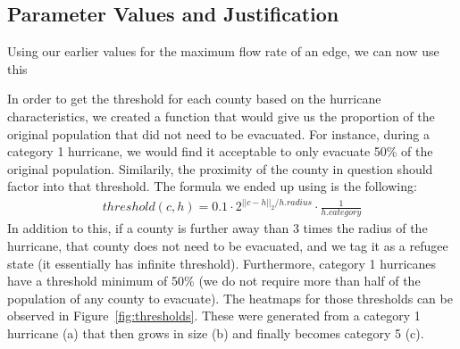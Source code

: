 \documentclass[titlepage]{article}
\begin{document}
  \subsection{Parameter Values and Justification}
    Using our earlier values for the maximum flow rate of an edge, we can now use this

    In order to get the threshold for each county based on the hurricane characteristics, we created a function that would give us the proportion of the original population that did not need to be evacuated. For instance, during a category 1 hurricane, we would find it acceptable to only evacuate 50\% of the original population. Similarily, the proximity of the county in question should factor into that threshold.
    The formula we ended up using is the following:
    \begin{align*}
        threshold(c, h) = 0.1 \cdot 2^{||c-h||_2 / h.radius} \cdot \frac{1}{h.category}
    \end{align*}
    In addition to this, if a county is further away than 3 times the radius of the hurricane, that county does not need to be evacuated, and we tag it as a refugee state (it essentially has infinite threshold). Furthermore, category 1 hurricanes have a threshold minimum of 50\% (we do not require more than half of the population of any county to evacuate). 
    The heatmaps for those thresholds can be observed in Figure~\ref{fig:thresholds}. These were generated from a category 1 hurricane (a) that then grows in size (b) and finally becomes category 5 (c).
\end{document}
